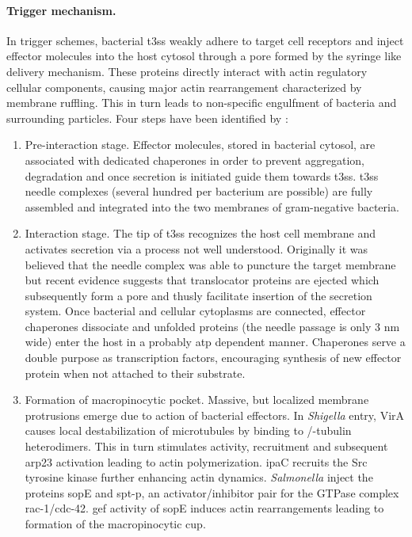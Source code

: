 \paragraph{Trigger mechanism.}
In trigger schemes, bacterial \gls{t3ss} weakly adhere to target cell receptors and inject effector molecules into the host cytosol through a pore formed by the syringe like delivery mechanism. These proteins directly interact with actin regulatory cellular components, causing major actin rearrangement characterized by membrane ruffling. This in turn leads to non-specific engulfment of bacteria and surrounding particles. Four steps have been identified by \citeauthor{Cossart2004}:
\begin{enumerate}[label=(\alph*)]
  \item Pre-interaction stage. Effector molecules, stored in bacterial cytosol, are associated with dedicated chaperones in order to prevent aggregation, degradation and once secretion is initiated guide them towards \gls{t3ss}. \Gls{t3ss} needle complexes (several hundred per bacterium are possible) are fully assembled and integrated into the two membranes of gram-negative bacteria.
  \item Interaction stage. The tip of \gls{t3ss} recognizes the host cell membrane and activates secretion via a process not well understood. Originally it was believed that the needle complex was able to puncture the target membrane but recent evidence suggests that translocator proteins are ejected which subsequently form a pore and thusly facilitate insertion of the secretion system. Once bacterial and cellular cytoplasms are connected, effector chaperones dissociate and unfolded proteins (the needle passage is only 3 nm wide) enter the host in a probably \gls{atp} dependent manner. Chaperones serve a double purpose as transcription factors, encouraging synthesis of new effector protein when not attached to their substrate.
  \item Formation of macropinocytic pocket. Massive, but localized membrane protrusions emerge due to action of bacterial effectors. In \textit{Shigella} entry, VirA causes local destabilization of microtubules by binding to \textalpha\slash \textbeta-tubulin heterodimers. This in turn stimulates  activity,  recruitment and subsequent \gls{arp23} activation leading to actin polymerization. \Acrshort{ipa}C recruits the Src tyrosine kinase further enhancing actin dynamics. \textit{Salmonella} inject the proteins \acrshort{sop}E and \acrshort{spt-p}, an activator\slash inhibitor pair for the GTPase complex \gls{rac-1}\slash \gls{cdc-42}. \Gls{gef} activity of \acrshort{sop}E induces actin rearrangements leading to formation of the macropinocytic cup.

\end{enumerate}
